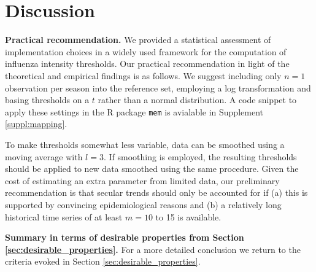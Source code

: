 \documentclass[12pt]{article}
\begin{document}

\section{Discussion}
\label{sec:discussion}

\textbf{Practical recommendation.} We provided a statistical assessment of implementation choices in a widely used framework for the computation of influenza intensity thresholds. Our practical recommendation in light of the theoretical and empirical findings is as follows. We suggest including only $n = 1$ observation per season into the reference set, employing a log transformation and basing thresholds on a $t$ rather than a normal distribution. A code snippet to apply these settings in the R package \texttt{mem} is avialable in Supplement \ref{suppl:mapping}.

To make thresholds somewhat less variable, data can be smoothed using a moving average with $l = 3$. If smoothing is employed, the resulting thresholds should be applied to new data smoothed using the same procedure. Given the cost of estimating an extra parameter from limited data, our preliminary recommendation is that secular trends should only be accounted for if (a) this is supported by convincing epidemiological reasons and (b) a relatively long historical time series of at least $m = 10$ to 15 is available. %


\noindent \textbf{Summary in terms of desirable properties from Section \ref{sec:desirable_properties}.} For a more detailed conclusion we return to the criteria evoked in Section \ref{sec:desirable_properties}.
\end{document}
